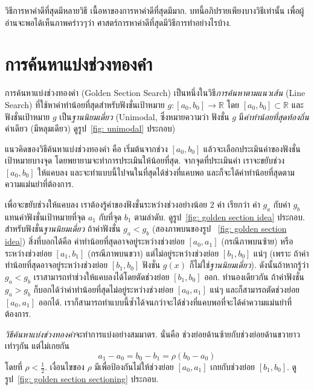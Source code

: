 วิธีการหาค่าดีที่สุดมีหลายวิธี เนื้อหาของการหาค่าดีที่สุดมีมาก.
บทนี้อภิปรายเพียงบางวิธีเท่านั้น เพื่อผู้อ่านจะพอได้เห็นภาพคร่าวๆว่า ศาสตร์การหาค่าดีที่สุดมีวิธีการทำอย่างไรบ้าง.

\section{การค้นหาแบ่งช่วงทองคำ}
\label{sec: golden section search}

การค้นหาแบ่งช่วงทองคำ (Golden Section Search) เป็นหนึ่งในวิธี\textit{การค้นหาตามแนวเส้น} (Line Search) ที่ใช้หาค่าทำน้อยที่สุดสำหรับฟังชั่นเป้าหมาย $g: [a_0,b_0] \to \mathbb{R}$ โดย $[a_0,b_0] \subset \mathbb{R}$ และฟังชั่นเป้าหมาย $g$ เป็น\textit{ฐานนิยมเดี่ยว} (Unimodal, ซึ่งหมายความว่า ฟังชั่น $g$ มี\textit{ค่าทำน้อยที่สุดท้องถิ่น}ค่าเดียว (มีหลุมเดียว) ดูรูป~\ref{fig: unimodal} ประกอบ)

แนวคิดของวิธีค้นหาแบ่งช่วงทองคำ คือ 
เริ่มต้นจากช่วง $[a_0, b_0]$ แล้วจะเลือกประเมินค่าของฟังชั่นเป้าหมายบางจุด โดยพยายามจะทำการประเมินให้น้อยที่สุด.
จากจุดที่ประเมินค่า เราจะขยับช่วง $[a_0, b_0]$ ให้แคบลง และจะทำแบบนี้ไปจนในที่สุดได้ช่วงที่แคบพอ และก็จะได้ค่าทำน้อยที่สุดตามความแม่นยำที่ต้องการ.

เพื่อจะขยับช่วงให้แคบลง เราต้องรู้ค่าของฟังชั่นระหว่างช่วงอย่างน้อย $2$ ค่า เรียกว่า ค่า $g_a$ กับค่า $g_b$ แทนค่าฟังชั่นเป้าหมายที่จุด $a_1$ กับที่จุด $b_1$ ตามลำดับ.
ดูรูป~\ref{fig: golden section idea} ประกอบ.
สำหรับฟังชั่น\textit{ฐานนิยมเดี่ยว} ถ้าค่าฟังชั่น $g_a < g_b$ (สองภาพบนของรูป~ \ref{fig: golden section idea}) สิ่งที่บอกได้คือ ค่าทำน้อยที่สุดอาจอยู่ระหว่างช่วงย่อย $[a_0,a_1]$ (กรณีภาพบนซ้าย) 
หรือระหว่างช่วงย่อย $[a_1, b_1]$ (กรณีภาพบนขวา) 
แต่ไม่อยู่ระหว่างช่วงย่อย $[b_1, b_0]$ แน่ๆ 
(เพราะ ถ้าค่าทำน้อยที่สุดอาจอยู่ระหว่างช่วงย่อย $[b_1, b_0]$ 
ฟังชั่น $g(x)$ ก็ไม่ใช่\textit{ฐานนิยมเดี่ยว}).
ดังนั้นถ้าหากรู้ว่า $g_a < g_b$ เราสามารถทำช่วงให้แคบลงได้โดยตัดช่วงย่อย $[b_1, b_0]$ ออก.
ทำนองเดียวกัน ถ้าค่าฟังชั่น $g_a > g_b$ ก็บอกได้ว่าค่าทำน้อยที่สุดไม่อยู่ระหว่างช่วงย่อย $[a_0,a_1]$ แน่ๆ
และก็สามารถตัดช่วงย่อย $[a_0, a_1]$ ออกได้.
เราก็สามารถทำแบบนี้ซ้ำได้จนกว่าจะได้ช่วงที่แคบพอที่จะได้ค่าความแม่นยำที่ต้องการ.

\textit{วิธีค้นหาแบ่งช่วงทองคำ}จะทำการแบ่งอย่างสมมาตร.
นั่นคือ ช่วงย่อยด้านซ้ายกับช่วงย่อยด้านขวายาวเท่าๆกัน แต่ไม่เกยกัน
\begin{equation}
   a_1 - a_0 = b_0 - b_1 = \rho (b_0 - a_0)
\end{equation}
โดยที่ $\rho < \frac{1}{2}$.
เงื่อนไขของ $\rho$ มีเพื่อป้องกันไม่ให้ช่วงย่อย $[a_0,a_1]$ เกยกับช่วงย่อย $[b_1, b_0]$.
ดูรูป~\ref{fig: golden section sectioning} ประกอบ.

